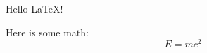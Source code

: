 \documentclass{article}
\begin{document}
Hello \LaTeX!

Here is some math: 
\[
    E = mc^2
\]
\end{document}
